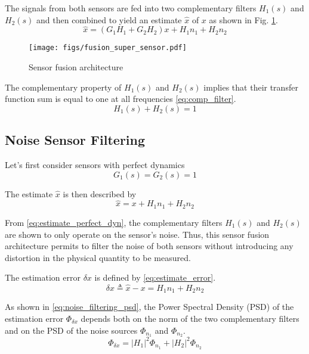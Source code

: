 \documentclass[letterpaper, 10 pt, conference]{ieeeconf}
\begin{document}
The signals from both sensors are fed into two complementary filters \(H_1(s)\) and \(H_2(s)\) and then combined to yield an estimate \(\hat{x}\) of \(x\) as shown in Fig. \ref{fig:fusion_super_sensor}.
\begin{equation}
\label{eq:comp_filter_estimate}
  \hat{x} = \left(G_1 H_1 + G_2 H_2\right) x + H_1 n_1 + H_2 n_2
\end{equation}

\begin{figure}[htbp]
\centering
\texttt{[image: figs/fusion\_super\_sensor.pdf]}
\caption{\label{fig:fusion_super_sensor}
Sensor fusion architecture}
\end{figure}

The complementary property of \(H_1(s)\) and \(H_2(s)\) implies that their transfer function sum is equal to one at all frequencies \eqref{eq:comp_filter}.
\begin{equation}
\label{eq:comp_filter}
  H_1(s) + H_2(s) = 1
\end{equation}

\subsection{Noise Sensor Filtering}
\label{sec:org3904fad}
\label{sec:noise_filtering}

Let's first consider sensors with perfect dynamics
\begin{equation}
\label{eq:perfect_dynamics}
  G_1(s) = G_2(s) = 1
\end{equation}

The estimate \(\hat{x}\) is then described by
\begin{equation}
\label{eq:estimate_perfect_dyn}
  \hat{x} = x + H_1 n_1 + H_2 n_2
\end{equation}

From \eqref{eq:estimate_perfect_dyn}, the complementary filters \(H_1(s)\) and \(H_2(s)\) are shown to only operate on the sensor's noise.
Thus, this sensor fusion architecture permits to filter the noise of both sensors without introducing any distortion in the physical quantity to be measured.

The estimation error \(\delta x\) is defined by \eqref{eq:estimate_error}.
\begin{equation}
\label{eq:estimate_error}
  \delta x \triangleq \hat{x} - x = H_1 n_1 + H_2 n_2
\end{equation}

As shown in \eqref{eq:noise_filtering_psd}, the Power Spectral Density (PSD) of the estimation error \(\Phi_{\delta x}\) depends both on the norm of the two complementary filters and on the PSD of the noise sources \(\Phi_{n_1}\) and \(\Phi_{n_2}\).
\begin{equation}
\label{eq:noise_filtering_psd}
  \Phi_{\delta x} = \left|H_1\right|^2 \Phi_{n_1} + \left|H_2\right|^2 \Phi_{n_2}
\end{equation}
\end{document}
